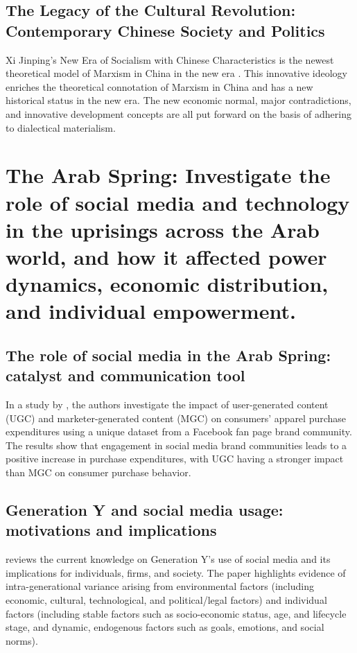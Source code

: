 \documentclass{article}
\begin{document}
\subsection{The Legacy of the Cultural Revolution: Contemporary Chinese Society and Politics}

Xi Jinping's New Era of Socialism with Chinese Characteristics is the newest theoretical model of Marxism in China in the new era \cite{Qian2019XiJN}. This innovative ideology enriches the theoretical connotation of Marxism in China and has a new historical status in the new era. The new economic normal, major contradictions, and innovative development concepts are all put forward on the basis of adhering to dialectical materialism.


\section{The Arab Spring: Investigate the role of social media and technology in the uprisings across the Arab world, and how it affected power dynamics, economic distribution, and individual empowerment.}

\subsection{The role of social media in the Arab Spring: catalyst and communication tool}

In a study by \cite{Goh2013SocialMB}, the authors investigate the impact of user-generated content (UGC) and marketer-generated content (MGC) on consumers' apparel purchase expenditures using a unique dataset from a Facebook fan page brand community. The results show that engagement in social media brand communities leads to a positive increase in purchase expenditures, with UGC having a stronger impact than MGC on consumer purchase behavior.

\subsection{Generation Y and social media usage: motivations and implications}

\cite{Bolton2013UnderstandingGY} reviews the current knowledge on Generation Y's use of social media and its implications for individuals, firms, and society. The paper highlights evidence of intra-generational variance arising from environmental factors (including economic, cultural, technological, and political/legal factors) and individual factors (including stable factors such as socio-economic status, age, and lifecycle stage, and dynamic, endogenous factors such as goals, emotions, and social norms).
\end{document}

